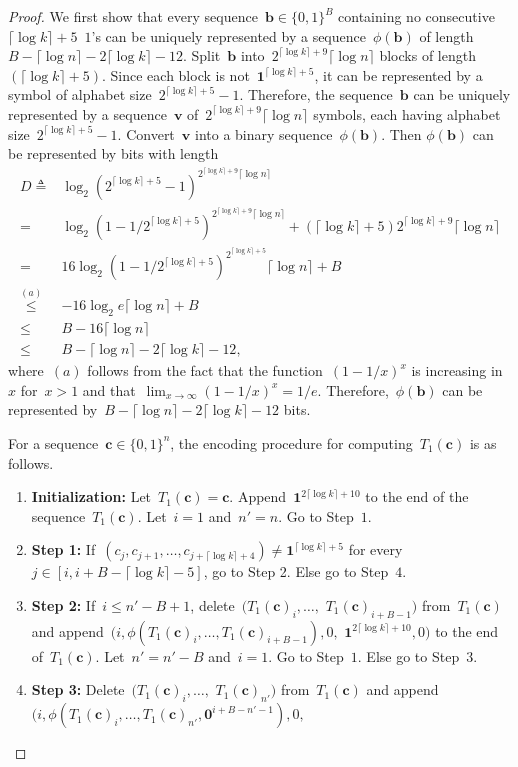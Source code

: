 \documentclass[10pt,a4paper,onecolumn]{IEEEtran}
\newcommand{\1}{\mathbbold{1}}
\newcommand{\boldb}{\mathbf{b}}
\newcommand{\boldc}{\mathbf{c}}
\newcommand{\boldv}{\mathbf{v}}
\begin{document}
\begin{proof}
We first show that
every sequence~$\boldb\in\{0,1\}^{B}$ containing no consecutive~$\lceil \log k\rceil+5$~$1$'s can be uniquely represented by a sequence~$\phi(\boldb)$ of length~$B-\lceil \log n\rceil-2\lceil \log k\rceil-12$.
Split~$\boldb$ into~$2^{\lceil \log k\rceil+9}\lceil \log n \rceil$ blocks of length~$(\lceil \log k\rceil+5)$. Since each block is not~$\boldsymbol{1}^{\lceil \log k\rceil+5}$, it can be represented by a symbol of alphabet size~$2^{\lceil \log k\rceil+5}-1$. Therefore, the sequence~$\boldb$ can be uniquely represented by a sequence~$\boldv$ of~$2^{\lceil \log k\rceil+9}\lceil \log n \rceil$ symbols, each having alphabet size~$2^{\lceil \log k\rceil+5}-1$. Convert~$\boldv$ into a binary sequence~$\phi (\boldb)$. Then $\phi(\boldb)$ can be represented by bits with length 
\begin{align}\label{equation:lengthofphib}
D\triangleq & \log_2 (2^{\lceil \log k\rceil+5}-1)^{2^{\lceil \log k\rceil+9}\lceil \log n \rceil} \nonumber\\
= &\log_2 (1-1/2^{\lceil \log k\rceil+5})^{2^{\lceil \log k\rceil+9}\lceil \log n \rceil} + (\lceil \log k\rceil+5)2^{\lceil \log k\rceil+9}\lceil \log n \rceil\nonumber\\
= &16\log_2 (1-1/2^{\lceil \log k\rceil+5})^{2^{\lceil \log k\rceil+5}} \lceil \log n \rceil+B \nonumber\\
\overset{(a)}{\le}&-16\log_2 e \lceil \log n \rceil+B\nonumber\\
\le&B-16\lceil \log n\rceil\nonumber\\
\le&B-\lceil \log n\rceil-2\lceil \log k\rceil-12,
\end{align}
where~$(a)$ follows from the fact that the function~$(1-1/x)^x$ is increasing in~$x$ for~$x>1$ and that~$\lim_{x\rightarrow \infty}(1-1/x)^x=1/e$.
Therefore,~$\phi(\boldb)$ can be represented by~$B-\lceil \log n\rceil-2\lceil \log k\rceil-12$ bits.

For a sequence~$\boldc\in\{0,1\}^n$, the encoding procedure for computing~$T_1(\boldc)$ is as follows.
\begin{enumerate}
    \item \textbf{Initialization:} Let~$T_1(\boldc)=\boldc$.
    Append~$\boldsymbol{1}^{2\lceil \log k\rceil+10}$ to the end of the sequence~$T_1(\boldc)$. Let~$i=1$ and~$n'=n$. Go to Step~$1$.
    \item \textbf{Step 1:} If~$(c_{j},c_{j+1},\ldots,c_{j+\lceil \log k\rceil+4})\ne \boldsymbol{1}^{\lceil \log k\rceil+5}$ for every~$j\in [i,i+B-\lceil \log k\rceil-5]$, go to Step 2. Else go to Step~$4$.
    \item \textbf{Step 2:} If~$i\le n'-B+1$,
    delete~$(T_1(\boldc)_{i},\ldots,$ $T_1(\boldc)_{i+B-1})$ from~$T_1(\boldc)$ and  append~$(i,\phi(T_1(\boldc)_{i},\ldots,T_1(\boldc)_{i+B-1}),0,$ $\boldsymbol{1}^{2\lceil \log k\rceil+10},0)$ to the end of~$T_1(\boldc)$. 
    Let~$n'=n'-B$ and~$i=1$. Go to Step~$1$.
    Else go to Step~$3$.
    \item \textbf{Step 3:} Delete~$(T_1(\boldc)_{i},\ldots,$ $T_1(\boldc)_{n'})$ from~$T_1(\boldc)$ and  append~$(i,\phi(T_1(\boldc)_{i},\ldots,T_1(\boldc)_{n'},\boldsymbol{0}^{i+B-n'-1}),0,$
    

\end{enumerate}
\end{proof}
\end{document}
